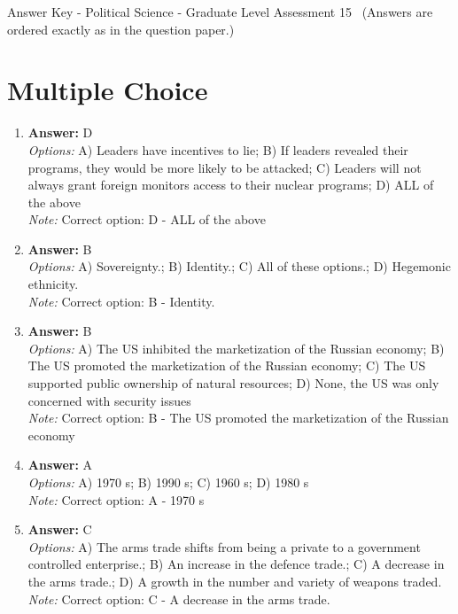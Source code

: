 \documentclass[12pt]{article}
\begin{document}
\begin{center}
Answer Key - Political Science - Graduate Level Assessment 15 \
\small (Answers are ordered exactly as in the question paper.)
\end{center}

\section*{Multiple Choice}
\begin{enumerate}[label=\arabic*.]
\item \textbf{Answer:} D
\\ \textit{Options:} A) Leaders have incentives to lie; B) If leaders revealed their programs, they would be more likely to be attacked; C) Leaders will not always grant foreign monitors access to their nuclear programs; D) ALL of the above
\\ \textit{Note:} Correct option: D - ALL of the above
\item \textbf{Answer:} B
\\ \textit{Options:} A) Sovereignty.; B) Identity.; C) All of these options.; D) Hegemonic ethnicity.
\\ \textit{Note:} Correct option: B - Identity.
\item \textbf{Answer:} B
\\ \textit{Options:} A) The US inhibited the marketization of the Russian economy; B) The US promoted the marketization of the Russian economy; C) The US supported public ownership of natural resources; D) None, the US was only concerned with security issues
\\ \textit{Note:} Correct option: B - The US promoted the marketization of the Russian economy
\item \textbf{Answer:} A
\\ \textit{Options:} A) 1970 s; B) 1990 s; C) 1960 s; D) 1980 s
\\ \textit{Note:} Correct option: A - 1970 s
\item \textbf{Answer:} C
\\ \textit{Options:} A) The arms trade shifts from being a private to a government controlled enterprise.; B) An increase in the defence trade.; C) A decrease in the arms trade.; D) A growth in the number and variety of weapons traded.
\\ \textit{Note:} Correct option: C - A decrease in the arms trade.
\end{enumerate}
\end{document}
